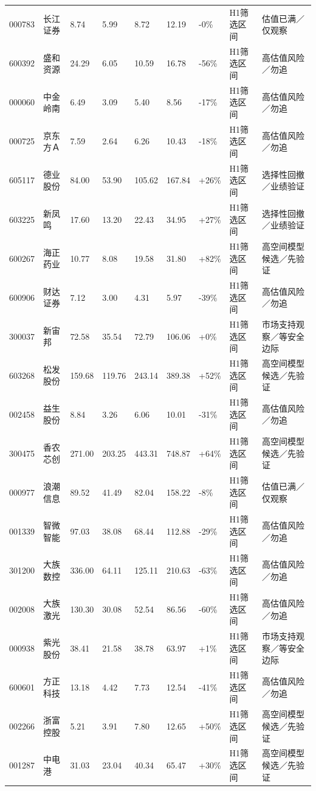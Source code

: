 \begin{longtable}{L{1.05cm}L{1.55cm}R{0.95cm}R{0.95cm}R{1.05cm}R{0.95cm}R{0.95cm}L{2.15cm}L{2.55cm}}
000783 & 长江证券 & 8.74 & 5.99 & 8.72 & 12.19 & -0\% & H1筛选区间 & 估值已满／仅观察 \\
600392 & 盛和资源 & 24.29 & 6.05 & 10.59 & 16.78 & -56\% & H1筛选区间 & 高估值风险／勿追 \\
000060 & 中金岭南 & 6.49 & 3.09 & 5.40 & 8.56 & -17\% & H1筛选区间 & 高估值风险／勿追 \\
000725 & 京东方Ａ & 7.59 & 2.64 & 6.26 & 10.43 & -18\% & H1筛选区间 & 高估值风险／勿追 \\
605117 & 德业股份 & 84.00 & 53.90 & 105.62 & 167.84 & +26\% & H1筛选区间 & 选择性回撤／业绩验证 \\
603225 & 新凤鸣 & 17.60 & 13.20 & 22.43 & 34.95 & +27\% & H1筛选区间 & 选择性回撤／业绩验证 \\
600267 & 海正药业 & 10.77 & 8.08 & 19.58 & 31.80 & +82\% & H1筛选区间 & 高空间模型候选／先验证 \\
600906 & 财达证券 & 7.12 & 3.00 & 4.31 & 5.97 & -39\% & H1筛选区间 & 高估值风险／勿追 \\
300037 & 新宙邦 & 72.58 & 35.54 & 72.79 & 106.06 & +0\% & H1筛选区间 & 市场支持观察／等安全边际 \\
603268 & 松发股份 & 159.68 & 119.76 & 243.14 & 389.38 & +52\% & H1筛选区间 & 高空间模型候选／先验证 \\
002458 & 益生股份 & 8.84 & 3.26 & 6.06 & 10.01 & -31\% & H1筛选区间 & 高估值风险／勿追 \\
300475 & 香农芯创 & 271.00 & 203.25 & 443.31 & 748.87 & +64\% & H1筛选区间 & 高空间模型候选／先验证 \\
000977 & 浪潮信息 & 89.52 & 41.49 & 82.04 & 158.22 & -8\% & H1筛选区间 & 估值已满／仅观察 \\
001339 & 智微智能 & 97.03 & 38.08 & 68.44 & 112.88 & -29\% & H1筛选区间 & 高估值风险／勿追 \\
301200 & 大族数控 & 336.00 & 64.11 & 125.11 & 210.63 & -63\% & H1筛选区间 & 高估值风险／勿追 \\
002008 & 大族激光 & 130.30 & 30.08 & 52.54 & 86.56 & -60\% & H1筛选区间 & 高估值风险／勿追 \\
000938 & 紫光股份 & 38.41 & 21.58 & 38.78 & 63.97 & +1\% & H1筛选区间 & 市场支持观察／等安全边际 \\
600601 & 方正科技 & 13.18 & 4.42 & 7.73 & 12.54 & -41\% & H1筛选区间 & 高估值风险／勿追 \\
002266 & 浙富控股 & 5.21 & 3.91 & 7.80 & 12.65 & +50\% & H1筛选区间 & 高空间模型候选／先验证 \\
001287 & 中电港 & 31.03 & 23.04 & 40.34 & 65.47 & +30\% & H1筛选区间 & 高空间模型候选／先验证 \\

\end{longtable}
